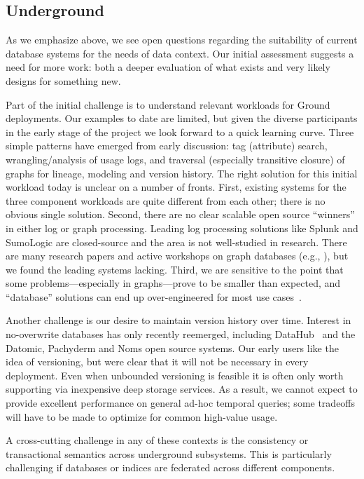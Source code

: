 \documentclass{cidr-2017}
\begin{document}
\subsection{Underground}
As we emphasize above, we see open questions regarding the suitability of current database systems for the needs of data context. Our initial assessment suggests a need for more work: both a deeper evaluation of what exists and very likely designs for something new. 

Part of the initial challenge is to understand relevant workloads for Ground deployments.  Our examples to date are limited, but given the diverse participants in the early stage of the project we look forward to a quick learning curve. Three simple patterns have emerged from early discussion: tag (attribute) search, wrangling/analysis of usage logs, and traversal (especially transitive closure) of graphs for lineage, modeling and version history. The right solution for this initial workload today is unclear on a number of fronts. First, existing systems for the three component workloads are quite different from each other; there is no obvious single solution. Second, there are no clear scalable open source ``winners'' in either log or graph processing. Leading log processing solutions like Splunk and SumoLogic are closed-source and the area is not well-studied in research. There are many research papers and active workshops on graph databases (e.g., \cite{grades16}), but we found the leading systems lacking.  Third, we are sensitive to the point that some problems---especially in graphs---prove to be smaller than expected, and ``database'' solutions can end up over-engineered for most use cases~\cite{mcsherry2015scalability}. 

Another challenge is our desire to maintain version history over time. Interest in no-overwrite databases has only recently reemerged, including DataHub~\cite{datahub} and the Datomic, Pachyderm and Noms open source systems. Our early users like the idea of versioning, but were clear that it will not be necessary in every deployment. Even when unbounded versioning is feasible it is often only worth supporting via inexpensive deep storage services. As a result, we cannot expect to provide excellent performance on general ad-hoc temporal queries; some tradeoffs will have to be made to optimize for common high-value usage.  

A cross-cutting challenge in any of these contexts is the consistency or transactional semantics across underground subsystems. This is particularly challenging if databases or indices are federated across different components.
\end{document}
